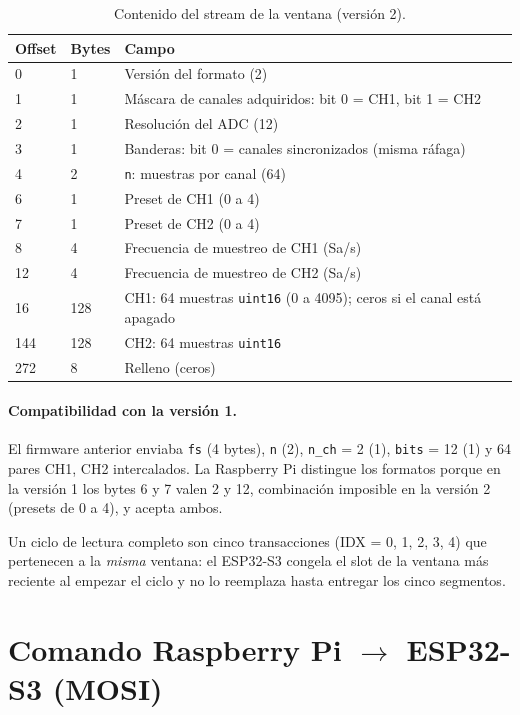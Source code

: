 \documentclass[12pt,a4paper]{article}
\begin{document}
\begin{table}[H]
\centering
\small
\begin{tabular}{@{}p{1.5cm} p{1.4cm} p{12.1cm}@{}}
\toprule
\textbf{Offset} & \textbf{Bytes} & \textbf{Campo} \\
\midrule
0   & 1   & Versión del formato (2) \\
1   & 1   & Máscara de canales adquiridos: bit 0 = CH1, bit 1 = CH2 \\
2   & 1   & Resolución del ADC (12) \\
3   & 1   & Banderas: bit 0 = canales sincronizados (misma ráfaga) \\
4   & 2   & \texttt{n}: muestras por canal (64) \\
6   & 1   & Preset de CH1 (0 a 4) \\
7   & 1   & Preset de CH2 (0 a 4) \\
8   & 4   & Frecuencia de muestreo de CH1 (Sa/s) \\
12  & 4   & Frecuencia de muestreo de CH2 (Sa/s) \\
16  & 128 & CH1: 64 muestras \texttt{uint16} (0 a 4095); ceros si el canal está apagado \\
144 & 128 & CH2: 64 muestras \texttt{uint16} \\
272 & 8   & Relleno (ceros) \\
\bottomrule
\end{tabular}
\caption{Contenido del stream de la ventana (versión 2).}
\end{table}

\paragraph{Compatibilidad con la versión 1.} El firmware anterior enviaba \texttt{fs} (4 bytes), \texttt{n} (2), \texttt{n\_ch} = 2 (1), \texttt{bits} = 12 (1) y 64 pares CH1, CH2 intercalados. La Raspberry Pi distingue los formatos porque en la versión 1 los bytes 6 y 7 valen 2 y 12, combinación imposible en la versión 2 (presets de 0 a 4), y acepta ambos.

Un ciclo de lectura completo son cinco transacciones (IDX = 0, 1, 2, 3, 4) que pertenecen a la \emph{misma} ventana: el ESP32-S3 congela el slot de la ventana más reciente al empezar el ciclo y no lo reemplaza hasta entregar los cinco segmentos.

\section{Comando Raspberry Pi $\rightarrow$ ESP32-S3 (MOSI)}
\end{document}
